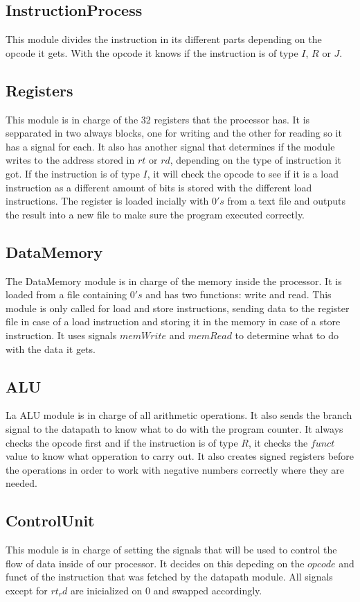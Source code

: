 \documentclass[12pt,a4paper]{article}
\begin{document}
\subsection{InstructionProcess}
\text This module divides the instruction in its different parts depending on the opcode it gets. With the opcode it knows if the instruction is of type $I$, $R$ or $J$.

\subsection{Registers}
\text This module is in charge of the 32 registers that the processor has. It is sepparated in two always blocks, one for writing and the other for reading so it has a signal for each. It also has another signal that determines if the module writes to the address stored in $rt$ or $rd$, depending on the type of instruction it got. If the instruction is of type $I$, it will check the opcode to see if it is a load instruction as a different amount of bits is stored with the different load instructions. The register is loaded incially with $0's$ from a text file and outputs the result into a new file to make sure the program executed correctly.

\subsection{DataMemory}
\text The DataMemory module is in charge of the memory inside the processor. It is loaded from a file containing $0's$ and has two functions: write and read. This module is only called for load and store instructions, sending data to the register file in case of a load instruction and storing it in the memory in case of a store instruction. It uses signals $memWrite$ and $memRead$ to determine what to do with the data it gets.

\subsection{ALU}
\text La ALU module is in charge of all arithmetic operations. It also sends the branch signal to the datapath to know what to do with the program counter. It always checks the opcode first and if the instruction is of type $R$, it checks the $funct$ value to know what opperation to carry out. It also creates signed registers before the operations in order to work with negative numbers correctly where they are needed.

\subsection{ControlUnit}
\text This module is in charge of setting the signals that will be used to control the flow of data inside of our processor. It decides on this depeding on the $opcode$ and funct of the instruction that was fetched by the datapath module. All signals except for $rt_rd$ are inicialized on 0 and swapped accordingly.
\end{document}
